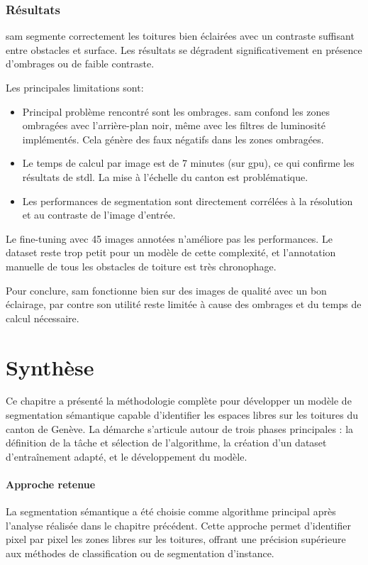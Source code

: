 \subsubsection{Résultats}

\acrshort{sam} segmente correctement les toitures bien éclairées avec un contraste suffisant entre obstacles et surface. Les résultats se dégradent significativement en présence d'ombrages ou de faible contraste.

Les principales limitations sont:
\begin{itemize}
    \item Principal problème rencontré sont les ombrages. \acrshort{sam} confond les zones ombragées avec l'arrière-plan noir, même avec les filtres de luminosité implémentés. Cela génère des faux négatifs dans les zones ombragées.
    \item Le temps de calcul par image est de 7 minutes (sur \acrshort{gpu}), ce qui confirme les résultats de \acrshort{stdl}. La mise à l'échelle du canton est problématique.
    \item Les performances de segmentation sont directement corrélées à la résolution et au contraste de l'image d'entrée.
\end{itemize}

Le fine-tuning avec 45 images annotées n'améliore pas les performances. Le dataset reste trop petit pour un modèle de cette complexité, et l'annotation manuelle de tous les obstacles de toiture est très chronophage.

Pour conclure, \acrshort{sam} fonctionne bien sur des images de qualité avec un bon éclairage, par contre son utilité reste limitée à cause des ombrages et du temps de calcul nécessaire.

\section{Synthèse}

Ce chapitre a présenté la méthodologie complète pour développer un modèle de segmentation sémantique capable d'identifier les espaces libres sur les toitures du canton de Genève. La démarche s'articule autour de trois phases principales : la définition de la tâche et sélection de l'algorithme, la création d'un dataset d'entraînement adapté, et le développement du modèle.

\paragraph{Approche retenue}
La segmentation sémantique a été choisie comme algorithme principal après l'analyse réalisée dans le chapitre précédent. Cette approche permet d'identifier pixel par pixel les zones libres sur les toitures, offrant une précision supérieure aux méthodes de classification ou de segmentation d'instance.

